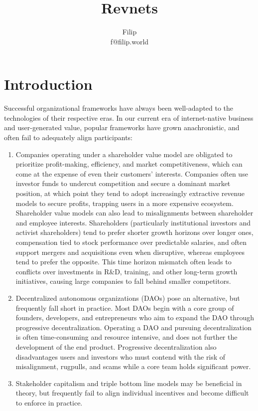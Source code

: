 \documentclass{article}
\title{Revnets}
\author{Filip\\f@filip.world}
\begin{document}
\maketitle

\section{Introduction}

Successful organizational frameworks have always been well-adapted to the technologies of their respective eras. In our current era of internet-native business and user-generated value, popular frameworks have grown anachronistic, and often fail to adequately align participants:

\begin{enumerate}
  \item Companies operating under a shareholder value model are obligated to prioritize profit-making, efficiency, and market competitiveness, which can come at the expense of even their customers' interests. Companies often use investor funds to undercut competition and secure a dominant market position, at which point they tend to adopt increasingly extractive revenue models to secure profits, trapping users in a more expensive ecosystem. Shareholder value models can also lead to misalignments between shareholder and employee interests. Shareholders (particularly institutional investors and activist shareholders) tend to prefer shorter growth horizons over longer ones, compensation tied to stock performance over predictable salaries, and often support mergers and acquisitions even when disruptive, whereas employees tend to prefer the opposite. This time horizon mismatch often leads to conflicts over investments in R\&D, training, and other long-term growth initiatives, causing large companies to fall behind smaller competitors.
  \item Decentralized autonomous organizations (DAOs) pose an alternative, but frequently fall short in practice. Most DAOs begin with a core group of founders, developers, and entrepreneurs who aim to expand the DAO through progressive decentralization. Operating a DAO and pursuing decentralization is often time-consuming and resource intensive, and does not further the development of the end product. Progressive decentralization also disadvantages users and investors who must contend with the risk of misalignment, rugpulls, and scams while a core team holds significant power.
  \item Stakeholder capitalism and triple bottom line models may be beneficial in theory, but frequently fail to align individual incentives and become difficult to enforce in practice.
\end{enumerate}
\end{document}
